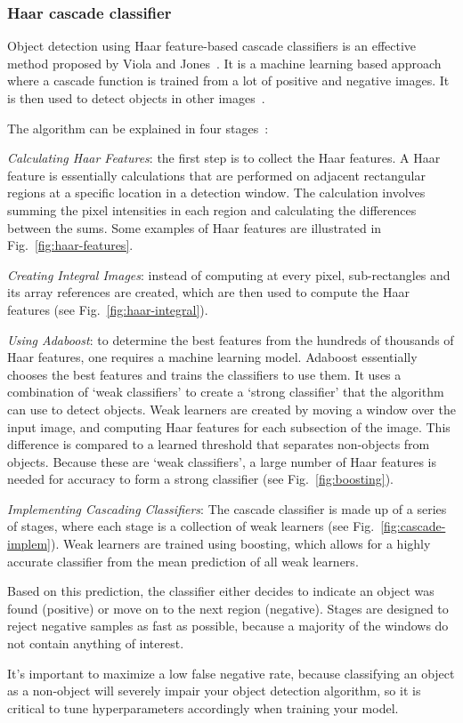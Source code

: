 \subsubsection{Haar cascade classifier}
\label{sec:haar-casc-class}
Object detection using Haar feature-based cascade classifiers is an effective
method proposed by Viola and Jones~\cite{viola2001rapid}. It is a machine
learning based approach where a cascade function is trained from a lot of
positive and negative images. It is then used to detect objects in other images~\cite{opencv-haar-classif}.

The algorithm can be explained in four stages~\cite{haar-classif-explained}:
\begin{enum-c}
\item \emph{Calculating Haar Features}: the first step is to collect the Haar features. A Haar feature is essentially calculations that are performed on
adjacent rectangular regions at a specific location in a detection window. The
calculation involves summing the pixel intensities in each region and
calculating the differences between the sums. Some
examples of Haar features are illustrated in Fig.~\ref{fig:haar-features}.
\item \emph{Creating Integral Images}: instead of computing at every
pixel, sub-rectangles and its array references are created, which are then used
to compute the Haar features (see Fig.~\ref{fig:haar-integral}).
\item \emph{Using Adaboost}: to determine the best features from the hundreds of
  thousands of Haar features, one requires a machine learning model.
  Adaboost essentially chooses the best features and trains the classifiers to
  use them. It uses a combination of `weak classifiers' to create a `strong classifier' that the algorithm can use to detect objects.
Weak learners are created by moving a window over the input image, and computing Haar features for each
subsection of the image. This difference is compared to a learned threshold that
separates non-objects from objects. Because these are `weak classifiers', a large number of Haar features is needed for accuracy to form
a strong classifier (see Fig.~\ref{fig:boosting}). 
\item \emph{Implementing Cascading Classifiers}:
The cascade classifier is made up of a series of stages, where each stage is a
collection of weak learners (see Fig.~\ref{fig:cascade-implem}).
Weak learners are trained using boosting, which allows for a highly accurate
classifier from the mean prediction of all weak learners.

Based on this prediction, the classifier either decides to indicate an object
was found (positive) or move on to the next region (negative). Stages are designed to reject negative samples as fast as possible, because a
majority of the windows do not contain anything of interest.

It's important to maximize a low false negative rate, because classifying an object as a non-object will
severely impair your object detection algorithm, so it is critical to tune hyperparameters accordingly when training your model.
\end{enum-c}
